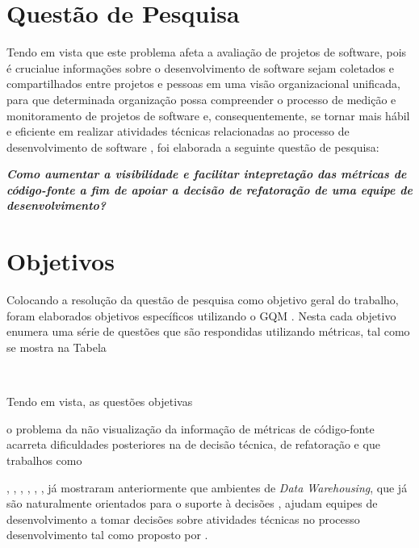 
\section{Questão de Pesquisa}

Tendo em vista que este problema afeta a avaliação de projetos de software, pois é crucialue informações sobre o desenvolvimento de software sejam coletados e compartilhados entre projetos e pessoas em uma visão organizacional unificada, para que determinada organização possa compreender o processo de medição e monitoramento de projetos de software e, consequentemente, se tornar mais hábil e eficiente em realizar atividades técnicas relacionadas ao processo de desenvolvimento de software \cite{Chulani2003}, foi elaborada a seguinte questão de pesquisa:

\textit{\textbf{Como aumentar a
visibilidade e facilitar intepretação das 
métricas de código-fonte
a fim de apoiar a decisão de refatoração
de uma equipe de desenvolvimento?}}


\section{Objetivos}

Colocando a resolução da questão de pesquisa como objetivo geral do trabalho, foram elaborados objetivos específicos utilizando o GQM \cite{Basili96b}. Nesta cada objetivo enumera uma série de questões que são respondidas utilizando métricas, tal como se mostra na Tabela 



\

	  Tendo em vista, as questões objetivas 


	  o problema da não visualização da informação de métricas de código-fonte acarreta dificuldades posteriores na de decisão técnica, de refatoração e que trabalhos como 



	  , , , , , , já mostraram anteriormente que ambientes de \textit{Data Warehousing}, que já são naturalmente orientados para o suporte à decisões , ajudam equipes de desenvolvimento a tomar decisões sobre atividades técnicas no processo desenvolvimento tal como proposto por .  


